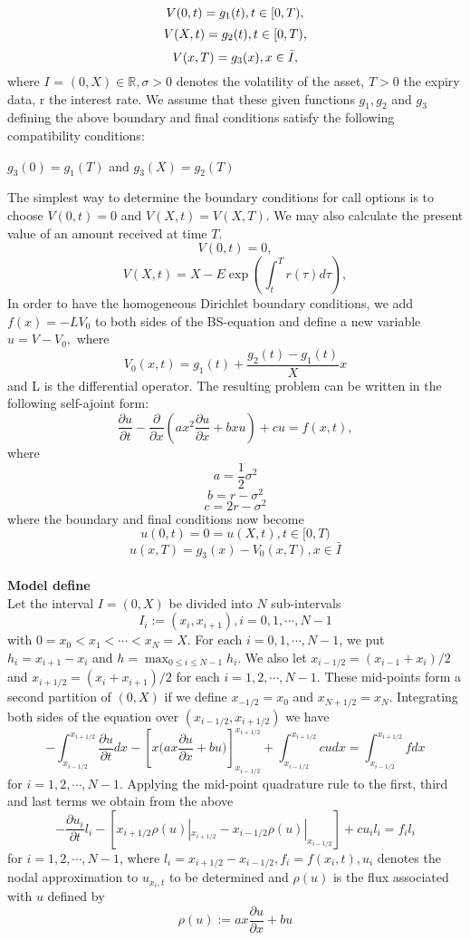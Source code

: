 \documentclass{article}
\begin{document}
$$V(0,t) = g_1(t)\space\space\space\space\space\space ,t \in [0,T),$$
$$V(X,t) = g_2(t)\space\space\space\space\space\space ,t \in [0,T),$$
$$V(x,T) = g_3(x)\space\space\space\space\space\space ,x \in \bar{I},$$
where $I$ = $(0,X)\in \mathbb{R}, \sigma > 0$ denotes the volatility of the asset, $T > 0 $ the expiry data, r the interest rate. We assume that these given functions $g_1, g_2$ and $g_3$ defining the above boundary and final conditions satisfy the following compatibility conditions:
\begin{center}
$g_3(0) = g_1(T)$ and $  g_3(X) = g_2(T)$
\end{center}
The simplest way to determine the boundary conditions for call options is to choose $V(0,t) = 0$ and $V(X,t) = V(X,T)$. We may also calculate the present value of an amount received at time $T$.\\
$$V(0,t)=0,$$
$$V(X,t)=X-E\exp\left(\int_{t}^{T} r(\tau)d\tau\right),$$
In order to have the homogeneous Dirichlet boundary conditions, we add $f(x)=-LV_0$ to both sides of the BS-equation and define a new variable $u = V - V_0,$ where
$$V_0(x,t)=g_1(t) + \frac{g_2(t) - g_1(t)}{X}x$$
and L is the differential operator. The resulting problem can be written in the following self-ajoint form:
$$\frac{\partial u}{\partial t}- \frac{\partial}{\partial x}(ax^2\frac{\partial u}{\partial x}+bxu) + cu= f(x,t),$$
where
$$a = \frac{1}{2} \sigma^2$$
$$b = r - \sigma^2$$
$$c = 2r - \sigma^2$$
where the boundary and final conditions now become
$$u(0,t) = 0 = u(X,t), t\in [0,T)$$
$$u(x,T) = g_3(x) - V_0(x,T), x\in \bar{I}$$\\
\textbf{Model define}\\
Let the interval $I = (0, X) $ be divided into $N$ sub-intervals
$$
I_i := (x_{i}, x_{i+1}), i= 0, 1, \cdots, N-1
$$
with $0 = x_0 < x_1 < \cdots < x_N = X$. For each $i = 0, 1, \cdots, N-1$, we put $h_i = x_{i+1} - x_i$ and $h = \max_{0 \leq i \leq N-1}h_i$. We also let $x_{i-1/2} = (x_{i-1}+ x_i)/2$ and $x_{i+1/2} = (x_i + x_{i+1})/2$ for each $i = 1, 2, \cdots, N -1$. These mid-points form a second partition of $(0,X)$ if we define $x_{-1/2} = x_0$ and $x_{N+1/2} = x_N$. Integrating both sides of the equation over $(x_{i-1/2}, x_{i+1/2})$ we have
$$
-\int_{x_{i-1/2}}^{x_{i+1/2}} \frac{\partial u}{\partial t}dx -\left [ x({ax\frac {\partial u}{\partial x}+ bu)} \right ]_{x_{i-1/2}}^{x_{i+1/2}} + \int_{x_{i-1/2}}^{x_{i+1/2}}cudx = \int_{x_{i-1/2}}^{x_{i+1/2}}fdx
$$
for $i = 1, 2, \cdots, N-1$. Applying the mid-point quadrature rule to the first, third and last terms we obtain from the above
$$
-\frac{\partial u_i}{\partial t}l_i - [x_{i+1/2}\rho(u)|_{x_{i+1/2}}- x_{i-1/2}\rho(u)|_{x_{i-1/2}}]+cu_il_i = f_il_i
$$
for $i = 1, 2, \cdots, N-1$, where $l_i = x_{i+1/2} - x_{i-1/2},  f_i = f(x_i, t), u_i$ denotes the nodal approximation to $u_{x_i,t} $ to be determined and $\rho(u)$ is the flux associated with $u$ defined by
$$
\rho(u) := ax\frac{\partial u}{\partial x}+bu
$$
\end{document}
